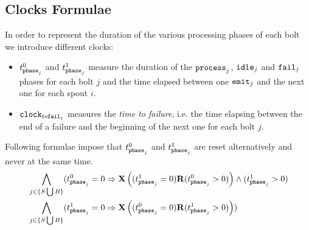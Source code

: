 %
%
%

%
\newpage
\subsection*{Clocks Formulae}
In order to represent the duration of the various processing phases of each bolt we introduce different clocks:
\begin{itemize}
	\item \textbf{$ t_{\mathtt{phase}_{j}}^{0} $} and \textbf{$ t_{\mathtt{phase}_{j}}^{1} $} measure the duration of the $ \mathtt{process}_{j} $, $ \mathtt{idle}_{j} $ and $ \mathtt{fail}_{j} $ phases for each bolt $ j $ and the time elapsed between one $ \mathtt{emit}_{j} $ and the next one for each spout $ i $.
	\item \textbf{$ \mathtt{clock}_{to\mathtt{fail}_{j}} $} measures the \textit{time to failure}, i.e. the time elapsing between the end of a failure and the beginning of the next one for each bolt $ j $.
\end{itemize}
%
Following formulae impose that $t_{\mathtt{phase}_{j}}^{0}$ and $t_{\mathtt{phase}_{j}}^{1}$ are reset alternatively and never at the same time.
\begin{align*}
%
& \bigwedge_{
	\begin{subarray}{c}
	j \in \{ S \bigcup  B \}\\
	\end{subarray}
	}
	(\tph{j}{0} =  0 \Rightarrow \X{(\tph{j}{1} = 0) \R (\tph{j}{0}>0)} \land (\tph{j}{1} > 0) \\
	& \bigwedge_{
	\begin{subarray}{c}
	j \in \{ S \bigcup  B \}\\
	\end{subarray}
	}
	(\tph{j}{1} =  0 \Rightarrow \X{(\tph{j}{0} = 0) \R (\tph{j}{1}>0)})	
		\end{align*}

